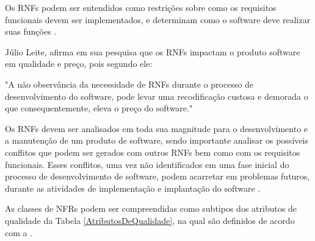 Os RNFs podem ser entendidos como restrições sobre como os requisitos funcionais devem ser implementados, e determinam como o software deve realizar suas funções \cite{sommerville1997requirements}.


Júlio Leite, afirma em sua pesquisa que os RNFs impactam o produto software em qualidade e preço, pois segundo ele:

\begin{citacao}
	"A não observância da necessidade de RNFs durante o processo de desenvolvimento do software, pode levar uma recodificação custosa e demorada o que consequentemente, eleva o preço do software." \cite[p. 2]{cysneiros1997definindo}
\end{citacao}

Os RNFs devem ser analisados em toda sua magnitude para o desenvolvimento e a manutenção de um produto de software, sendo importante analisar os possíveis conflitos que podem ser gerados com outros RNFs bem como com os requisitos funcionais. Esses conflitos, uma vez não identificados em uma fase inicial do processo de desenvolvimento de software, podem acarretar em problemas futuros, durante as atividades de implementação e implantação do software \cite{cysneiros1997definindo}. 


As classes de NFRs \cite{eckhardt2016non} podem ser compreendidas como subtipos dos atributos de qualidade da Tabela \ref{AtributosDeQualidade}, na qual são definidos de acordo com a \cite{organizacion2011iso}. 

